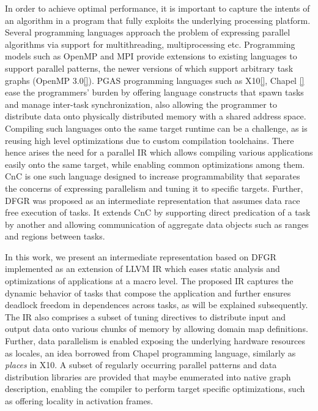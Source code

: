 In order to achieve optimal performance, it is important to capture the intents of an algorithm in a program that fully exploits the underlying processing platform. Several programming languages approach the problem of expressing parallel algorithms via support for multithreading, multiprocessing etc. Programming models such as OpenMP and MPI provide extensions to existing languages to support parallel patterns, the newer versions of which support arbitrary task graphs (OpenMP 3.0\ref{}). PGAS programming languages such as X10\ref{}, Chapel \ref{} ease the programmers' burden by offering language constructs that spawn tasks and manage inter-task synchronization, also allowing the programmer to distribute data onto physically distributed memory with a  shared address space. Compiling such languages onto the same target runtime can be a challenge, as is reusing high level optimizations due to custom compilation toolchains. There hence arises the need for a parallel IR which allows compiling various applications easily onto the same target, while enabling common optimizations among them. CnC is one such language designed to increase programmability that separates the concerns of expressing parallelism and tuning it to specific targets. Further, DFGR was proposed as an intermediate representation that assumes data race free execution of tasks. It extends CnC by supporting direct predication of a task by another and allowing communication of aggregate data objects such as ranges and regions between tasks. 

In this work, we present an intermediate representation based on DFGR implemented as an extension of LLVM IR which eases static analysis and optimizations of applications at a macro level. The proposed IR captures the dynamic behavior of tasks that compose the application and further ensures deadlock freedom in dependences across tasks, as will be explained subsequently. The IR also comprises a subset of tuning directives to distribute input and output data onto various chunks of memory by allowing domain map definitions. Further, data parallelism is enabled exposing the underlying hardware resources as locales, an idea borrowed from Chapel programming language, similarly as \textit{places} in X10. A subset of regularly occurring parallel patterns and data distribution libraries are provided that maybe enumerated into native graph description, enabling the compiler to perform target specific optimizations, such as offering locality in activation frames. 